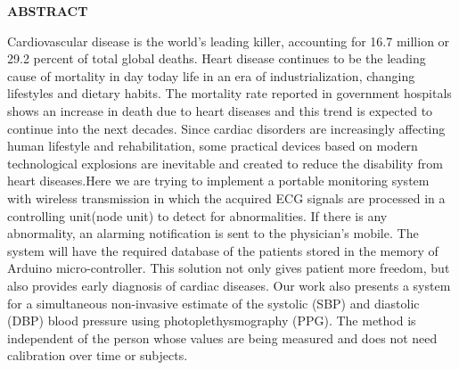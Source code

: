 \documentclass[12pt,a4paper]{report}
\begin{document}
\newpage
\begin{verbatim}
\end{verbatim}
\begin{center}
{\bf{ABSTRACT}}
\end{center}
\vspace{30pt}
\begin{doublespace}
\hspace*{1cm}                        Cardiovascular disease is the world's leading killer, accounting for 16.7 million or 29.2 percent of total global deaths. Heart disease continues to be the leading cause of mortality in day today life in an era of industrialization, changing lifestyles and dietary habits. The mortality rate reported in government hospitals shows an increase in death due to heart diseases and this trend is expected to continue into the next decades. Since cardiac disorders are increasingly affecting human lifestyle and rehabilitation, some practical devices based on modern technological explosions are inevitable and created to reduce the disability from heart diseases.Here we are trying to implement a portable monitoring system with wireless transmission in which the acquired ECG signals are processed in a controlling unit(node unit) to detect for abnormalities. If there is any abnormality, an alarming notification is sent to the physician’s mobile. The system will have the required database of the patients stored in the memory of Arduino micro-controller. This solution not only gives patient more freedom, but also provides early diagnosis of cardiac diseases. Our work also presents a system for a simultaneous non-invasive estimate of  the systolic (SBP) and diastolic (DBP) blood pressure using photoplethysmography (PPG).  The method is independent of the person whose values are being measured and does not need calibration over time or subjects.



\end{doublespace}


\newpage
{
%
}
\tableofcontents
{}
\listoffigures
{}
\end{document}
